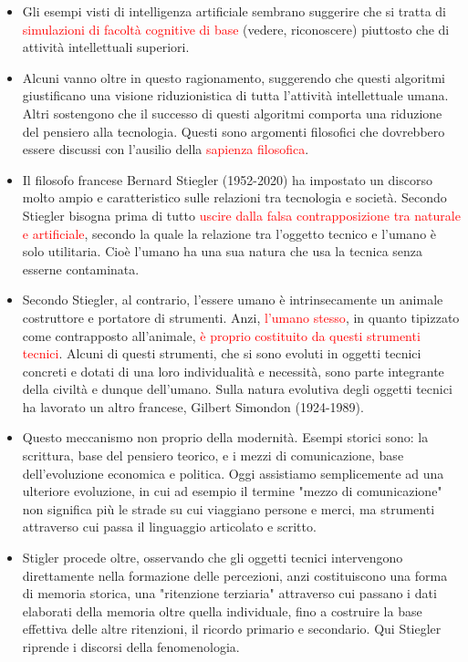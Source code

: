 \documentclass[xcolor=svgnames]{beamer}
\newcommand{\rosso}[1]{\textcolor{red}{#1}}
\renewcommand{\emph}{\rosso}
\begin{document}
\begin{frame}
  \begin{itemize}
  \item Gli esempi visti di intelligenza artificiale sembrano suggerire che si tratta di \emph{simulazioni di facoltà cognitive di base} (vedere, riconoscere) piuttosto che di attività intellettuali superiori. 
  \item Alcuni vanno oltre in questo ragionamento, suggerendo che questi algoritmi giustificano una visione riduzionistica di tutta l'attività intellettuale umana. Altri sostengono che il successo di questi algoritmi comporta una riduzione del pensiero alla tecnologia. Questi sono argomenti filosofici che dovrebbero essere discussi con l'ausilio della \emph{sapienza filosofica}. 
\item 
Il filosofo francese Bernard Stiegler (1952-2020) ha impostato un discorso molto ampio e caratteristico sulle relazioni tra tecnologia e società. Secondo Stiegler bisogna prima di tutto \emph{uscire dalla falsa contrapposizione tra naturale e artificiale}, secondo la quale la relazione tra l'oggetto tecnico e l'umano \`e solo utilitaria. Cio\`e l'umano ha una sua natura che usa la tecnica senza esserne contaminata. 
\item
  Secondo Stiegler, al contrario, l'essere umano è intrinsecamente un animale costruttore e portatore di strumenti. Anzi, \emph{l'umano stesso}, in quanto tipizzato come contrapposto all'animale, \emph{è proprio costituito da questi strumenti tecnici}. Alcuni di questi strumenti, che si sono evoluti in oggetti tecnici concreti e dotati di una loro individualità e necessità, sono parte integrante della civiltà e dunque dell'umano. Sulla natura evolutiva degli oggetti tecnici ha lavorato un altro francese, Gilbert Simondon (1924-1989).

  \item Questo meccanismo non proprio della modernit\`a. Esempi storici sono: la scrittura, base del pensiero teorico, e i mezzi di comunicazione, base dell'evoluzione economica e politica. Oggi assistiamo semplicemente ad una ulteriore evoluzione, in cui ad esempio il termine "mezzo di comunicazione" non significa più le strade su cui viaggiano persone e merci, ma strumenti attraverso cui passa il linguaggio articolato e scritto.
\item
Stigler procede oltre, osservando che gli oggetti tecnici intervengono direttamente nella formazione delle percezioni, anzi costituiscono una forma di memoria storica, una "ritenzione terziaria" attraverso cui passano i dati elaborati della memoria oltre quella individuale, fino a costruire la base effettiva delle altre ritenzioni, il ricordo primario e secondario. Qui Stiegler riprende i discorsi della fenomenologia. 
  \end{itemize}
\end{frame}
\end{document}
